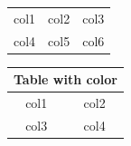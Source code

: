    \begin{table}[]
        \begin{tabular}{ | c | c | c | }
            \hline
                col1 & col2 & col3 \\
                col4 & col5 & col6 \\
            \hline
        \end{tabular}
    \end{table}

    \listoftables



    {
    \centering
    \begin{tabular}{|c|c|}
        \hline
        \multicolumn{2}{|c|}{Table with color} \\
        \hline
        col1 & col2 \\
        col3 & col4 \\
        \hline
    \end{tabular}
    } %


